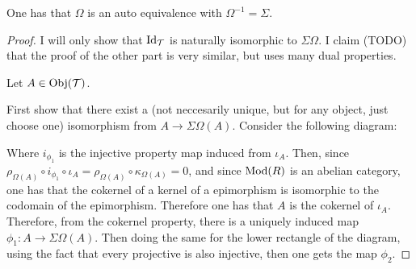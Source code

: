 \begin{theorem}
    One has that \( \Omega \) is an auto equivalence with \( \Omega^{-1} = \Sigma \).
\end{theorem}
\begin{proof}
    I will only show that \( \operatorname{Id}_{{\mathcal{T}}} \) is naturally isomorphic to \( \Sigma\Omega \). I claim (TODO) that the proof of the other part is very similar, but uses many dual properties.

    Let \( A \in \operatorname{Obj}({\mathcal{T}}) \).

    First show that there exist a (not neccesarily unique, but for any object, just choose one) isomorphism from \( A \to \Sigma\Omega(A) \). Consider the following diagram:

    \begin{center}
    \end{center}

    Where \( i_{\phi_1} \) is the injective property map induced from \( \iota_A \). Then, since \( \rho_{\Omega(A)} \circ i_{\phi_1} \circ \iota_A = \rho_{\Omega(A)} \circ \kappa_{\Omega(A)} = 0 \), and since \( \operatorname{Mod}(R) \) is an abelian category, one has that the cokernel of a kernel of a epimorphism is isomorphic to the codomain of the epimorphism. Therefore one has that \( A \) is the cokernel of \( \iota_A \). Therefore, from the cokernel property, there is a uniquely induced map \( \phi_1: A \to \Sigma\Omega(A) \). Then doing the same for the lower rectangle of the diagram, using the fact that every projective is also injective, then one gets the map \( \phi_2 \).


\end{proof}
